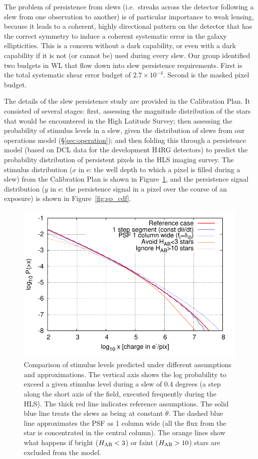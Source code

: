 The problem of persistence from slews (i.e.\ streaks across the detector following a slew from one observation to another) is of particular importance to weak lensing, because it leads to a coherent, highly directional pattern on the detector that has the correct symmetry to induce a coherent systematic error in the galaxy ellipticities. This is a concern without a dark capability, or even with a dark capability if it is not (or cannot be) used during every slew. Our group identified two budgets in WL that flow down into slew persistence requirements. First is the total systematic shear error budget of $2.7\times 10^{-4}$. Second is the masked pixel budget.

The details of the slew persistence study are provided in the Calibration Plan. It consisted of several stages: first, assessing the magnitude distribution of the stars that would be encountered in the High Latitude Survey; then assessing the probability of stimulus levels in a slew, given the distribution of slews from our operations model (\S\ref{sec:operation}); and then folding this through a persistence model (based on DCL data for the development H4RG detectors) to predict the probability distribution of persistent pixels in the HLS imaging survey. The stimulus distribution ($x$ in e: the well depth to which a pixel is filled during a slew) from the Calibration Plan is shown in Figure~\ref{fig:slewcompare}, and the persistence signal distribution ($y$ in e: the persistence signal in a pixel over the course of an exposure) is shown in Figure~\ref{fig:sp_cdf}.

\begin{figure}
\includegraphics[width=5in]{Plots/slew_compare.pdf}
\caption{\label{fig:slewcompare}Comparison of stimulus levels predicted
under different assumptions and approximations. The vertical axis
shows the log probability to exceed a given stimulus level during a
slew of 0.4 degrees (a step along the short axis of the field,
executed frequently during the HLS). The thick red line indicates
reference assumptions. The solid blue line treats the slews as being
at constant $\dot\theta$. The dashed blue line approximates the PSF as
1 column wide (all the flux from the star is concentrated in the
central column). The orange lines show what happens if bright ($H_{\rm
AB}<3$) or faint ($H_{\rm AB}>10$) stars are excluded from the model.}
\end{figure}

